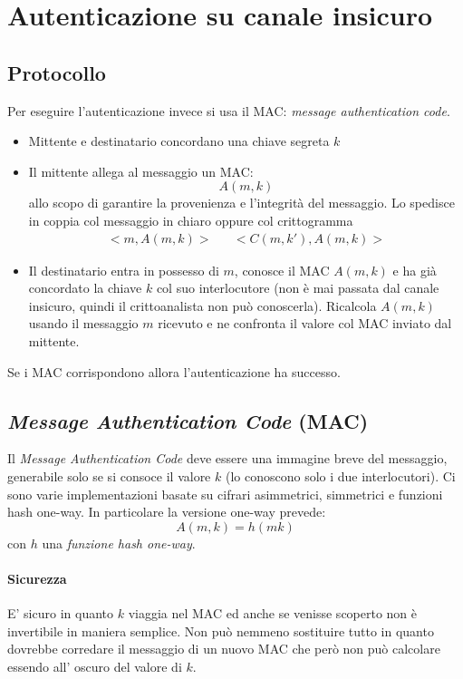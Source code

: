 \section{Autenticazione su canale insicuro}
\subsection{Protocollo}
Per eseguire l'autenticazione invece si usa il MAC: \emph{message authentication code}.
\begin{itemize}
    \item Mittente e destinatario concordano una chiave segreta $k$
    \item Il mittente allega al messaggio un MAC:
    $$ A(m,k) $$
    allo scopo di garantire la provenienza e l'integrità del messaggio. Lo spedisce in coppia col messaggio in chiaro oppure col crittogramma
    \begin{align*}
    	<m, A(m,k)> && <C(m,k'),A(m,k)>
    \end{align*}
    \item Il destinatario entra in possesso di $m$, conosce il MAC $A(m,k)$ e ha già concordato la chiave $k$ col suo interlocutore (non è mai passata dal canale insicuro, quindi il crittoanalista non può conoscerla). Ricalcola $A(m,k)$ usando il messaggio $m$ ricevuto e ne confronta il valore col MAC inviato dal mittente. 
\end{itemize}
Se i MAC corrispondono allora l'autenticazione ha successo.

\subsection{\emph{Message Authentication Code} (MAC)}
Il \emph{Message Authentication Code} deve essere una immagine breve del messaggio, generabile solo se si consoce il valore $k$ (lo conoscono solo i due interlocutori). Ci sono varie implementazioni basate su cifrari asimmetrici, simmetrici e funzioni hash one-way. In particolare la versione one-way prevede:
$$ A(m,k) = h(mk) $$
con $h$ una \emph{funzione hash one-way}.

\paragraph{Sicurezza} E' sicuro in quanto $k$ viaggia nel MAC ed anche se venisse scoperto non è invertibile in maniera semplice.
Non può nemmeno sostituire tutto in quanto dovrebbe corredare il messaggio di un nuovo MAC che però non può calcolare essendo all' oscuro del valore di $k$.

